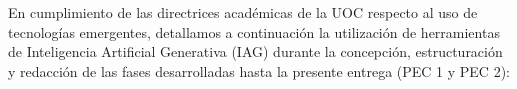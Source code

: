 \documentclass[IB]{TFUOC}%
\begin{document}

En cumplimiento de las directrices académicas de la UOC respecto al uso de tecnologías emergentes, detallamos a continuación la utilización de herramientas de Inteligencia Artificial Generativa (IAG) durante la concepción, estructuración y redacción de las fases desarrolladas hasta la presente entrega (PEC 1 y PEC 2):
\end{document}
